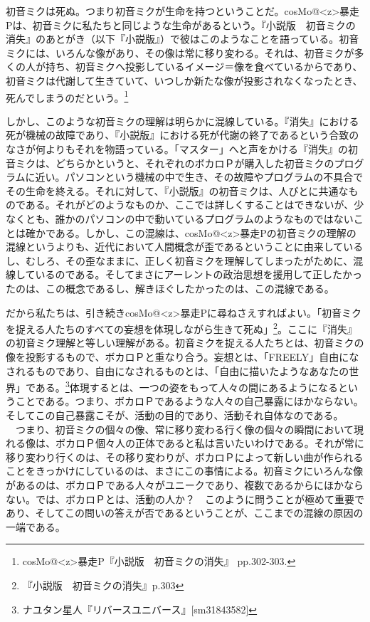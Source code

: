 \documentclass[b5j,twoside,twocolumn]{utarticle}
\begin{document}
初音ミクは死ぬ。つまり初音ミクが生命を持つということだ。cosMo@\pbox<z>{暴走}Pは、初音ミクに私たちと同じような生命があるという。『小説版　初音ミクの消失』のあとがき（以下『小説版』）で彼はこのようなことを語っている。初音ミクには、いろんな像があり、その像は常に移り変わる。それは、初音ミクが多くの人が持ち、初音ミクへ投影しているイメージ＝像を食べているからであり、初音ミクは代謝して生きていて、いつしか新たな像が投影されなくなったとき、死んでしまうのだという。\footnote{cosMo@\pbox<z>{暴走}P『小説版　初音ミクの消失』 pp.302-303.}


しかし、このような初音ミクの理解は明らかに混線している。『消失』における死が機械の故障であり、『小説版』における死が代謝の終了であるという合致のなさが何よりもそれを物語っている。「マスター」へと声をかける『消失』の初音ミクは、どちらかというと、それぞれのボカロＰが購入した初音ミクのプログラムに近い。パソコンという機械の中で生き、その故障やプログラムの不具合でその生命を終える。それに対して、『小説版』の初音ミクは、人びとに共通なものである。それがどのようなものか、ここでは詳しくすることはできないが、少なくとも、誰かのパソコンの中で動いているプログラムのようなものではないことは確かである。しかし、この混線は、cosMo@\pbox<z>{暴走}Pの初音ミクの理解の混線というよりも、近代において人間概念が歪であるということに由来しているし、むしろ、その歪なままに、正しく初音ミクを理解してしまったがために、混線しているのである。そしてまさにアーレントの政治思想を援用して正したかったのは、この概念であるし、解きほぐしたかったのは、この混線である。


だから私たちは、引き続きcosMo@\pbox<z>{暴走}Pに尋ねさえすればよい。「初音ミクを捉える人たちのすべての妄想を体現しながら生きて死ぬ」\footnote{『小説版　初音ミクの消失』p.303}。ここに『消失』の初音ミク理解と等しい理解がある。初音ミクを捉える人たちとは、初音ミクの像を投影するもので、ボカロＰと重なり合う。妄想とは、「FREELY」自由になされるものであり、自由になされるものとは、「自由に描いたようなあなたの世界」である。\footnote{ナユタン星人『リバースユニバース』[sm31843582]}体現するとは、一つの姿をもって人々の間にあるようになるということである。つまり、ボカロＰであるような人々の自己暴露にほかならない。そしてこの自己暴露こそが、活動の目的であり、活動それ自体なのである。
　つまり、初音ミクの個々の像、常に移り変わる行く像の個々の瞬間において現れる像は、ボカロＰ個々人の正体であると私は言いたいわけである。それが常に移り変わり行くのは、その移り変わりが、ボカロＰによって新しい曲が作られることをきっかけにしているのは、まさにこの事情による。初音ミクにいろんな像があるのは、ボカロＰである人々がユニークであり、複数であるからにほかならない。では、ボカロＰとは、活動の人か？　このように問うことが極めて重要であり、そしてこの問いの答えが否であるということが、ここまでの混線の原因の一端である。
\end{document}
